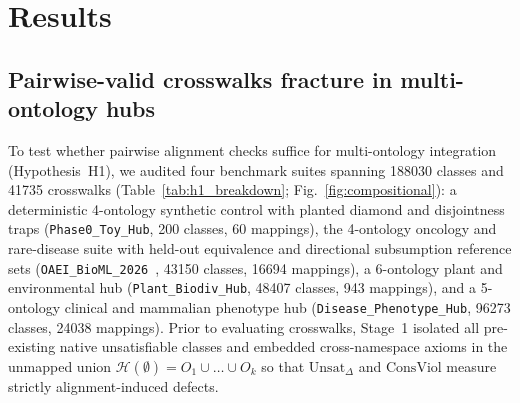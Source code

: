 \documentclass[10pt]{article}
\theoremstyle{accentdef}
\newcommand{\ClaspTotalClassesAll}{188030}
\newcommand{\ClaspTotalMappingsAll}{41735}
\newcommand{\ClaspDiseasePhenotypeHubClasses}{96273}
\newcommand{\ClaspDiseasePhenotypeHubMappings}{24038}
\newcommand{\ClaspOAEIBioMLClasses}{43150}
\newcommand{\ClaspOAEIBioMLMappings}{16694}
\newcommand{\ClaspPhaseToyHubClasses}{200}
\newcommand{\ClaspPhaseToyHubMappings}{60}
\newcommand{\ClaspPlantBiodivHubClasses}{48407}
\newcommand{\ClaspPlantBiodivHubMappings}{943}
\begin{document}
\section*{Results}

\subsection*{Pairwise-valid crosswalks fracture in multi-ontology hubs}

To test whether pairwise alignment checks suffice for multi-ontology integration (Hypothesis~H1), we audited four benchmark suites spanning \num{\ClaspTotalClassesAll} classes and \num{\ClaspTotalMappingsAll} crosswalks (Table~\ref{tab:h1_breakdown}; Fig.~\ref{fig:compositional}): a deterministic 4-ontology synthetic control with planted diamond and disjointness traps (\texttt{Phase0\_Toy\_Hub}, \num{\ClaspPhaseToyHubClasses} classes, \num{\ClaspPhaseToyHubMappings} mappings), the 4-ontology oncology and rare-disease suite with held-out equivalence and directional subsumption reference sets (\texttt{OAEI\_BioML\_2026}~\cite{he2022bioml}, \num{\ClaspOAEIBioMLClasses} classes, \num{\ClaspOAEIBioMLMappings} mappings), a 6-ontology plant and environmental hub (\texttt{Plant\_Biodiv\_Hub}, \num{\ClaspPlantBiodivHubClasses} classes, \num{\ClaspPlantBiodivHubMappings} mappings), and a 5-ontology clinical and mammalian phenotype hub (\texttt{Disease\_Phenotype\_Hub}, \num{\ClaspDiseasePhenotypeHubClasses} classes, \num{\ClaspDiseasePhenotypeHubMappings} mappings). Prior to evaluating crosswalks, Stage~1 isolated all pre-existing native unsatisfiable classes and embedded cross-namespace axioms in the unmapped union $\mathcal{H}(\emptyset) = O_1 \cup \dots \cup O_k$ so that $\mathrm{Unsat}_{\Delta}$ and $\mathrm{ConsViol}$ measure strictly alignment-induced defects.
\end{document}
